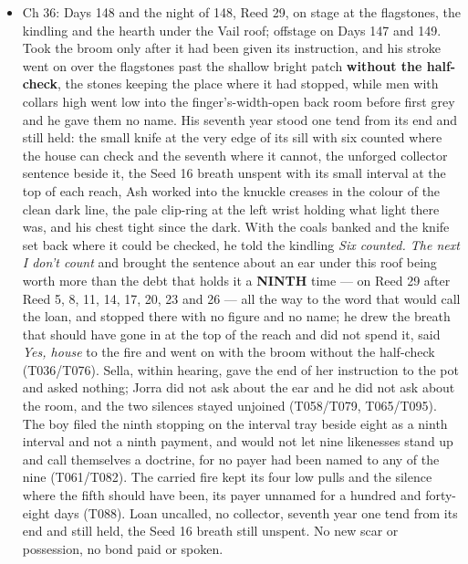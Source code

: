 \documentclass{design/chronicle}
\begin{document}
{\begin{itemize}[leftmargin=1.4em,itemsep=1pt,topsep=3pt,parsep=0pt]
\item Ch 36: Days 148 and the night of 148, Reed 29, on stage at the flagstones, the kindling and the hearth under the Vail roof; offstage on Days 147 and 149. Took the broom only after it had been given its instruction, and his stroke went on over the flagstones past the shallow bright patch \textbf{without the half-check}, the stones keeping the place where it had stopped, while men with collars high went low into the finger’s-width-open back room before first grey and he gave them no name. His seventh year stood one tend from its end and still held: the small knife at the very edge of its sill with six counted where the house can check and the seventh where it cannot, the unforged collector sentence beside it, the Seed 16 breath unspent with its small interval at the top of each reach, Ash worked into the knuckle creases in the colour of the clean dark line, the pale clip-ring at the left wrist holding what light there was, and his chest tight since the dark. With the coals banked and the knife set back where it could be checked, he told the kindling \emph{Six counted. The next I don’t count} and brought the sentence about an ear under this roof being worth more than the debt that holds it a \textbf{NINTH} time — on Reed 29 after Reed 5, 8, 11, 14, 17, 20, 23 and 26 — all the way to the word that would call the loan, and stopped there with no figure and no name; he drew the breath that should have gone in at the top of the reach and did not spend it, said \emph{Yes, house} to the fire and went on with the broom without the half-check (T036/T076). Sella, within hearing, gave the end of her instruction to the pot and asked nothing; Jorra did not ask about the ear and he did not ask about the room, and the two silences stayed unjoined (T058/T079, T065/T095). The boy filed the ninth stopping on the interval tray beside eight as a ninth interval and not a ninth payment, and would not let nine likenesses stand up and call themselves a doctrine, for no payer had been named to any of the nine (T061/T082). The carried fire kept its four low pulls and the silence where the fifth should have been, its payer unnamed for a hundred and forty-eight days (T088). Loan uncalled, no collector, seventh year one tend from its end and still held, the Seed 16 breath still unspent. No new scar or possession, no bond paid or spoken.

\end{itemize}

\begin{itemize}[leftmargin=1.4em,itemsep=1pt,topsep=3pt,parsep=0pt]


\end{itemize}}
\end{document}
